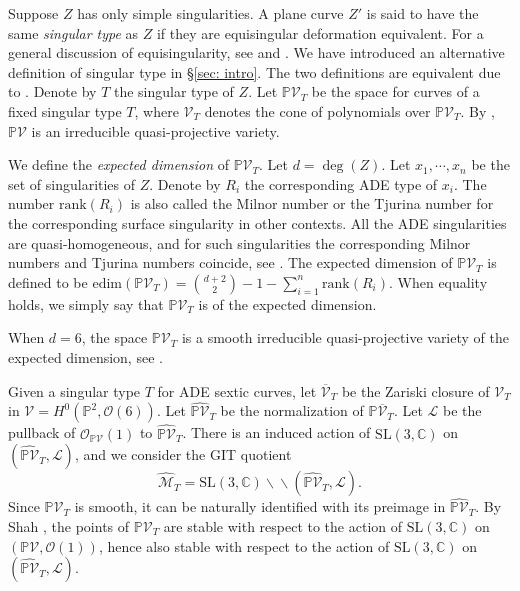 \documentclass[
]{article}
\begin{document}
Suppose \(Z\) has only simple singularities. A plane curve \(Z'\) is
said to have the same \emph{singular type} as \(Z\) if they are
equisingular deformation equivalent. For a general discussion of
equisingularity, see
\cite{zariski1965equisingularityI,zariski1965equisingularityII,zariski1968equisingularityIII}
and \cite{greuel2007singularities}. We have introduced an alternative
definition of singular type in §\ref{sec: intro}. The two definitions
are equivalent due to \cite[Proposition 2.1]{greuel1996equianalytic}.
Denote by \(T\) the singular type of \(Z\). Let
\(\mathbb{P}\mathcal{V}_T\) be the space for curves of a fixed singular
type \(T\), where \(\mathcal{V}_T\) denotes the cone of polynomials over
\(\mathbb{P}\mathcal{V}_T\). By \cite[Prop 2.1]{greuel1996equianalytic},
\(\mathbb{P}\mathcal{V}\) is an irreducible quasi-projective variety.

We define the \emph{expected dimension} of \(\mathbb{P}\mathcal{V}_T\).
Let \(d=\deg(Z)\). Let \(x_1,\cdots,x_n\) be the set of singularities of
\(Z\). Denote by \(R_i\) the corresponding ADE type of \(x_i\). The
number \(\mathrm{rank}(R_i)\) is also called the Milnor number or the
Tjurina number for the corresponding surface singularity in other
contexts. All the ADE singularities are quasi-homogeneous, and for such
singularities the corresponding Milnor numbers and Tjurina numbers
coincide, see \cite{saito1971quasihomogene}. The expected dimension of
\(\mathbb{P}\mathcal{V}_T\) is defined to be
\(\mathrm{edim}(\mathbb{P}\mathcal{V}_T)=\binom{d+2}{2}-1-\sum\limits_{i=1}^n \mathrm{rank}(R_i)\).
When equality holds, we simply say that \(\mathbb{P}\mathcal{V}_T\) is
of the expected dimension.

When \(d=6\), the space \(\mathbb{P}\mathcal{V}_T\) is a smooth
irreducible quasi-projective variety of the expected dimension, see
\cite[Corollary 5.1(b)]{greuel1996equianalytic}.

Given a singular type \(T\) for ADE sextic curves, let
\(\overline{\mathcal{V}}_T\) be the Zariski closure of \(\mathcal{V}_T\)
in \(\mathcal{V}=H^0(\mathbb{P}^2, \mathcal{O}(6))\). Let
\(\widehat{\mathbb{P}\mathcal{V}}_T\) be the normalization of
\(\mathbb{P}\overline{\mathcal{V}}_T\). Let \(\mathcal{L}\) be the
pullback of \(\mathcal{O}_{\mathbb{P}\mathcal{V}}(1)\) to
\(\widehat{\mathbb{P}\mathcal{V}}_T\). There is an induced action of
\(\mathrm{SL}(3, \mathbb{C})\) on
\((\widehat{\mathbb{P}\mathcal{V}}_T, \mathcal{L})\), and we consider
the GIT quotient
\[\widehat{\mathcal{M}}_T=\mathrm{SL}(3, \mathbb{C}) \backslash\!\! \backslash (\widehat{\mathbb{P}\mathcal{V}}_T, \mathcal{L}).\]
Since \(\mathbb{P}\mathcal{V}_T\) is smooth, it can be naturally
identified with its preimage in \(\widehat{\mathbb{P}\mathcal{V}}_T\).
By Shah \cite{shah1980complete}, the points of
\(\mathbb{P}\mathcal{V}_T\) are stable with respect to the action of
\(\mathrm{SL}(3, \mathbb{C})\) on
\((\mathbb{P}\mathcal{V}, \mathcal{O}(1))\), hence also stable with
respect to the action of \(\mathrm{SL}(3, \mathbb{C})\) on
\((\widehat{\mathbb{P}\mathcal{V}}_T, \mathcal{L})\).
\end{document}
